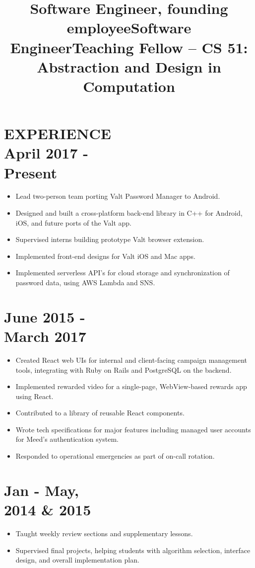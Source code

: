 \documentclass[centered, margin, 11pt]{res} %
\newcommand\mainsectionfont{\fontsize{10.5pt}{14pt}\selectfont\bf\textup}
\newcommand\subsectionfont{\small\textmd\textup}
\renewcommand\sectionfont{\mainsectionfont} %
\renewcommand\dates{\section} %
\newenvironment{rlist}
    {\begin{minipage}[t]{\linewidth}\begin{itemize}\raggedright}
    {\end{itemize}\end{minipage}}
\newenvironment{positionlist}
    {\begin{position}\begin{rlist}}
    {\end{rlist}\end{position}}
\begin{document}
\begin{resume}
\renewcommand\sectionfont{\subsectionfont} %

\section{{\mainsectionfont EXPERIENCE} \\ April 2017 - \\ Present }
\title{Software Engineer, founding employee}
\begin{positionlist}
  \item Lead two-person team porting Valt Password Manager to Android.
  \item Designed and built a cross-platform back-end library in C++ for
    Android, iOS, and future ports of the Valt app.
  \item Supervised interns building prototype Valt browser extension.
  \item Implemented front-end designs for Valt iOS and Mac apps.
  \item Implemented serverless API's for cloud storage and synchronization
    of password data, using AWS Lambda and SNS.
\end{positionlist}

\title{Software Engineer}
\dates{June 2015 - \\ March 2017}
\begin{positionlist}
  \item Created React web UIs for internal and client-facing
    campaign management tools, integrating with Ruby on Rails
    and PostgreSQL on the backend.
  \item Implemented rewarded video for a single-page, WebView-based
    rewards app using React.
  \item Contributed to a library of reusable React components.
  \item Wrote tech specifications for major features including managed user
    accounts for Meed's authentication system.
  \item Responded to operational emergencies as part of on-call rotation.
\end{positionlist}

\title{Teaching Fellow -- CS 51: Abstraction and Design in Computation}
\dates{Jan - May, \\ 2014 \& 2015}
\begin{positionlist}
  \item Taught weekly review sections and supplementary lessons.
  \item Supervised final projects, helping students with algorithm selection,
    interface design, and overall implementation plan.
\end{positionlist}


\end{resume}
\end{document}
